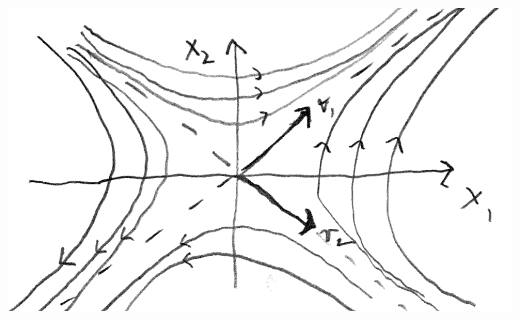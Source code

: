 \documentclass[12pt]{exam}
\begin{document}
\begin{enumerate}
    
    \includegraphics[scale=1.5]{./PhasePortrait2.png}
    
    \newpage
    

\end{enumerate}
\end{document}
